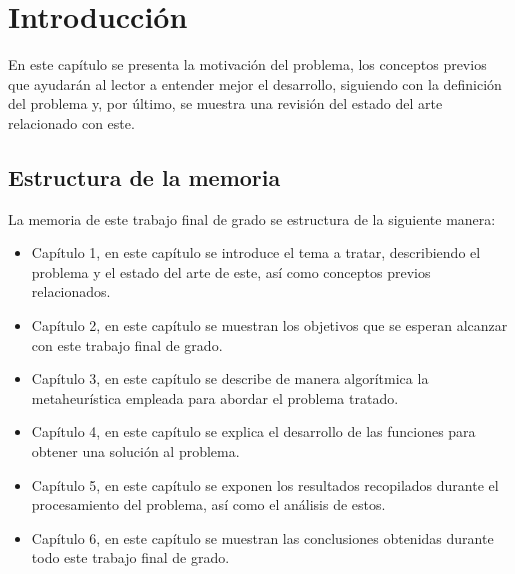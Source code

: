 
\chapter{Introducción} %

\label{Chapter1}


\newcommand{\keyword}[1]{\textbf{#1}}
\newcommand{\tabhead}[1]{\textbf{#1}}
\newcommand{\code}[1]{\texttt{#1}}
\newcommand{\file}[1]{\texttt{\bfseries#1}}
\newcommand{\option}[1]{\texttt{\itshape#1}}
\newcommand{\Mod}[1]{\ (\mathrm{mod}\ #1)}

En este capítulo se presenta la motivación del problema, los conceptos previos que ayudarán al lector a entender mejor el desarrollo, siguiendo con la definición del problema y, por último, se muestra una revisión del estado del arte relacionado con este.

\section{Estructura de la memoria}
La memoria de este trabajo final de grado se estructura de la siguiente manera:
\begin{itemize}
	\item Capítulo 1, en este capítulo se introduce el tema a tratar, describiendo el problema y el estado del arte de este, así como conceptos previos relacionados.
	\item Capítulo 2, en este capítulo se muestran los objetivos que se esperan alcanzar con este trabajo final de grado.
	\item Capítulo 3, en este capítulo se describe de manera algorítmica la metaheurística empleada para abordar el problema tratado.
	\item Capítulo 4, en este capítulo se explica el desarrollo de las funciones para obtener una solución al problema.
	\item Capítulo 5, en este capítulo se exponen los resultados recopilados durante el procesamiento del problema, así como el análisis de estos.
	\item Capítulo 6, en este capítulo se muestran las conclusiones obtenidas durante todo este trabajo final de grado.
\end{itemize}

